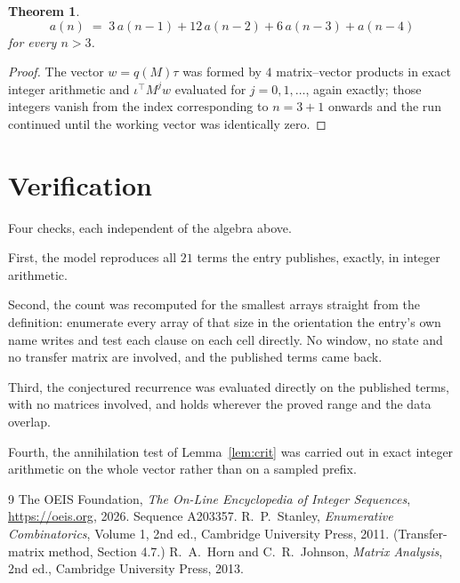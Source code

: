 \documentclass[11pt,a4paper]{article}
\theoremstyle{plain}
\newtheorem{theorem}{Theorem}
\theoremstyle{definition}
\begin{document}
\begin{theorem}
\[
a(n)\;=\;3\,a(n-1) + 12\,a(n-2) + 6\,a(n-3) + a(n-4)
\]
for every $n>3$.
\end{theorem}

\begin{proof}
The vector $w=q(M)\tau$ was formed by $4$ matrix--vector products in exact integer
arithmetic and $\iota^{\!\top}M^{j}w$ evaluated for $j=0,1,\dots$, again exactly; those
integers vanish from the index corresponding to $n=3+1$ onwards and the run continued
until the working vector was identically zero.
\end{proof}

\section{Verification}

Four checks, each independent of the algebra above.

First, the model reproduces all $21$ terms the entry publishes, exactly, in integer
arithmetic.

Second, the count was recomputed for the smallest arrays straight from the definition:
enumerate every array of that size in the orientation the entry's own name writes and test each
clause on each cell directly. No window, no state and no transfer matrix are involved, and the
published terms came back.

Third, the conjectured recurrence was evaluated directly on the published terms, with no
matrices involved, and holds wherever the proved range and the data overlap.

Fourth, the annihilation test of Lemma~\ref{lem:crit} was carried out in exact integer
arithmetic on the whole vector rather than on a sampled prefix.

\begin{thebibliography}{9}
 The OEIS Foundation, \emph{The On-Line Encyclopedia of Integer
Sequences}, \url{https://oeis.org}, 2026. Sequence A203357.
 R.~P.~Stanley, \emph{Enumerative Combinatorics}, Volume 1, 2nd ed.,
Cambridge University Press, 2011. (Transfer-matrix method, Section 4.7.)
 R.~A.~Horn and C.~R.~Johnson, \emph{Matrix Analysis}, 2nd ed., Cambridge
University Press, 2013.
\end{thebibliography}
\end{document}
